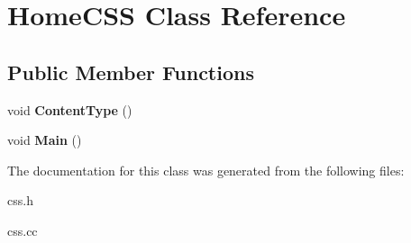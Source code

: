 \hypertarget{classHomeCSS}{\section{Home\-C\-S\-S Class Reference}
\label{classHomeCSS}
}
\subsection*{Public Member Functions}
\begin{DoxyCompactItemize}
\item 
\hypertarget{classHomeCSS_a7b0aa561a4b4aee682b9e51d64db1602}{void {\bfseries Content\-Type} ()}\label{classHomeCSS_a7b0aa561a4b4aee682b9e51d64db1602}

\item 
\hypertarget{classHomeCSS_a6b79a31efcc541dd383218288272d6d6}{void {\bfseries Main} ()}\label{classHomeCSS_a6b79a31efcc541dd383218288272d6d6}

\end{DoxyCompactItemize}


The documentation for this class was generated from the following files\-:\begin{DoxyCompactItemize}
\item 
css.\-h\item 
css.\-cc\end{DoxyCompactItemize}
